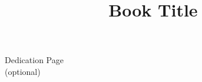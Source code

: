 \documentclass{psp-book9x6}
\title{Book Title}
\begin{document}
\titlepages                       

\begin{dedication}
\large Dedication Page \\[13pt]
\large (optional)
\end{dedication}

%                 
%               
%        
\tableofcontents



\setcounter{page}{1}




%




\printindex
\end{document}
